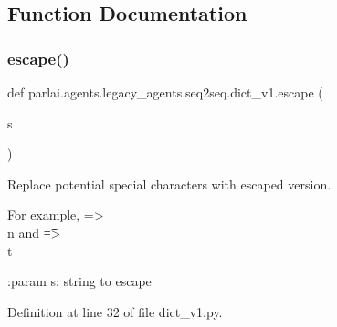 \subsection{Function Documentation}
\mbox{\label{namespaceparlai_1_1agents_1_1legacy__agents_1_1seq2seq_1_1dict__v1_a780f6055b01f2cffa03c670159317ee0}} 
\subsubsection{\texorpdfstring{escape()}{escape()}}
{\footnotesize\ttfamily def parlai.\+agents.\+legacy\+\_\+agents.\+seq2seq.\+dict\+\_\+v1.\+escape (\begin{DoxyParamCaption}\item[{}]{s }\end{DoxyParamCaption})}

\begin{DoxyVerb}Replace potential special characters with escaped version.

For example, \n => \\n and \t => \\t

:param s: string to escape
\end{DoxyVerb}
 

Definition at line 32 of file dict\+\_\+v1.\+py.


